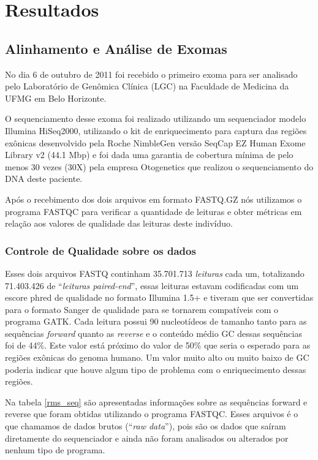 \chapter{Resultados}

\section{Alinhamento e Análise de Exomas}

No dia 6 de outubro de 2011 foi recebido o primeiro exoma para ser analisado pelo Laboratório de Genômica Clínica (LGC) na Faculdade de Medicina da UFMG em Belo Horizonte.

O sequenciamento desse exoma foi realizado utilizando um sequenciador modelo Illumina HiSeq2000, utilizando o kit de enriquecimento para captura das regiões exônicas desenvolvido pela Roche NimbleGen versão SeqCap EZ Human Exome Library v2 (44.1 Mbp) e foi dada uma garantia de cobertura mínima de pelo menos 30 vezes (30X) pela empresa Otogenetics que realizou o sequenciamento do DNA deste paciente.

Após o recebimento dos dois arquivos em formato FASTQ.GZ nós utilizamos o programa FASTQC para verificar a quantidade de leituras e obter métricas em relação aos valores de qualidade das leituras deste indivíduo.

\subsection{Controle de Qualidade sobre os dados}

Esses dois arquivos FASTQ continham 35.701.713 \textit{leituras} cada um, totalizando 71.403.426 de ``\textit{leituras paired-end}'', essas leituras estavam codificadas com um escore phred de qualidade no formato Illumina 1.5+ e tiveram que ser convertidas para o formato Sanger de qualidade para se tornarem compatíveis com o programa GATK. Cada leitura possui 90 nucleotídeos de tamanho tanto para as sequências \textit{forward} quanto as \textit{reverse} e o conteúdo médio GC dessas sequências foi de 44\%. Este valor está próximo do valor de 50\% que seria o esperado para as regiões exônicas do genoma humano. Um valor muito alto ou muito baixo de GC poderia indicar que houve algum tipo de problema com o enriquecimento dessas regiões.

Na tabela \ref{rms_seq} são apresentadas informações sobre as sequências forward e reverse que foram obtidas utilizando o programa FASTQC. Esses arquivos é o que chamamos de dados brutos (``\textit{raw data}''), pois são os dados que saíram diretamente do sequenciador e ainda não foram analisados ou alterados por nenhum tipo de programa.

